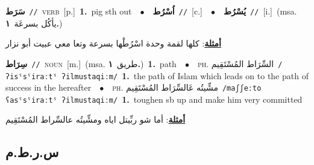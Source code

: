 \documentclass[10pt,a4paper,twoside]{article} %
\begin{document}
\begin{multicols}{2}
{\setlength\topsep{0pt}\textbf{\foreignlanguage{arabic}{سَرَط}}\ {\color{gray}\texttt{//}\color{black}}\ \textsc{verb}\ [p.]\ \textbf{1.}~pig sth out\ \ $\bullet$\ \ \setlength\topsep{0pt}\textbf{\foreignlanguage{arabic}{اُسْرُط}}\ {\color{gray}\texttt{//}\color{black}}\ [c.]\ \ $\bullet$\ \ \setlength\topsep{0pt}\textbf{\foreignlanguage{arabic}{يُسْرُط}}\ {\color{gray}\texttt{//}\color{black}}\ [i.]\ \color{gray}(msa. \foreignlanguage{arabic}{يأكُل بسرعَة}~\foreignlanguage{arabic}{\textbf{١.}})\color{black}\  \begin{flushright}\color{gray}\foreignlanguage{arabic}{\textbf{\underline{\foreignlanguage{arabic}{أمثلة}}}: كلها لقمة وحدة اسْرُطْها بسرعة وتعا معي عبيت أبو نزار}\end{flushright}\color{black}} \vspace{2mm}

{\setlength\topsep{0pt}\textbf{\foreignlanguage{arabic}{سِرَاط}}\ {\color{gray}\texttt{//}\color{black}}\ \textsc{noun}\ [m.]\ \color{gray}(msa. \foreignlanguage{arabic}{طريق}~\foreignlanguage{arabic}{\textbf{١.}})\color{black}\ \textbf{1.}~path\ \ $\bullet$\ \ \textsc{ph.} \color{gray} \foreignlanguage{arabic}{السِّرَاط المُسْتَقِيم}\color{black}\ {\color{gray}\texttt{/{\sffamily ʔisˤsˤiraːtˤ ʔilmustaqiːm}/}\color{black}}\ \textbf{1.}~the path of Islam which leads on to the path of success in the hereafter\ \ $\bullet$\ \ \textsc{ph.} \color{gray} \foreignlanguage{arabic}{مشِّيتُه عَالسِّرَاط المُسْتَقِيم}\color{black}\ {\color{gray}\texttt{/{\sffamily maʃʃeːto ʕasˤsˤiraːtˤ ʔilmustaqiːm}/}\color{black}}\ \textbf{1.}~toughen sb up and make him very committed\  \begin{flushright}\color{gray}\foreignlanguage{arabic}{\textbf{\underline{\foreignlanguage{arabic}{أمثلة}}}: أما شو ربِّيتل اياه ومشِّيتُه عالسِّراط المُسْتَقِيم}\end{flushright}\color{black}} \vspace{2mm}

\vspace{-3mm}
\subsection*{\color{blue}\foreignlanguage{arabic}{س.ر.ط.م}\color{blue}{ (ntws)}} 


\end{multicols}
\end{document}
